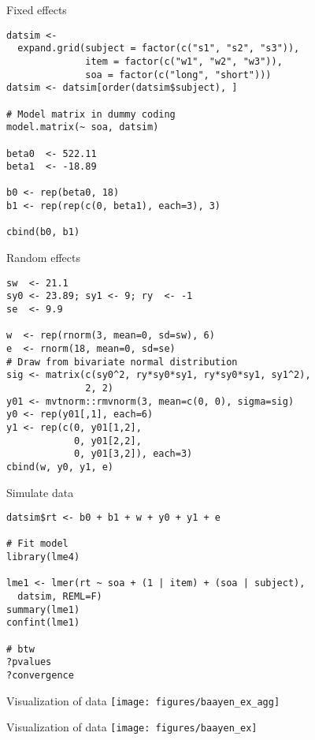 \documentclass{beamer}
\begin{document}
{

\begin{frame}[fragile]{Fixed effects}
  \begin{lstlisting}
datsim <- 
  expand.grid(subject = factor(c("s1", "s2", "s3")),
              item = factor(c("w1", "w2", "w3")),
              soa = factor(c("long", "short")))
datsim <- datsim[order(datsim$subject), ]

# Model matrix in dummy coding
model.matrix(~ soa, datsim)

beta0  <- 522.11
beta1  <- -18.89

b0 <- rep(beta0, 18)
b1 <- rep(rep(c(0, beta1), each=3), 3)

cbind(b0, b1)
  \end{lstlisting}
\end{frame}

\begin{frame}[fragile]{Random effects}
  \begin{lstlisting}
sw  <- 21.1
sy0 <- 23.89; sy1 <- 9; ry  <- -1
se  <- 9.9

w  <- rep(rnorm(3, mean=0, sd=sw), 6)
e  <- rnorm(18, mean=0, sd=se)
# Draw from bivariate normal distribution
sig <- matrix(c(sy0^2, ry*sy0*sy1, ry*sy0*sy1, sy1^2),
              2, 2)
y01 <- mvtnorm::rmvnorm(3, mean=c(0, 0), sigma=sig)
y0 <- rep(y01[,1], each=6)
y1 <- rep(c(0, y01[1,2],
            0, y01[2,2],
            0, y01[3,2]), each=3)
cbind(w, y0, y1, e)
  \end{lstlisting}
\end{frame}

\begin{frame}[fragile]{Simulate data}
  \begin{lstlisting}
datsim$rt <- b0 + b1 + w + y0 + y1 + e

# Fit model
library(lme4)

lme1 <- lmer(rt ~ soa + (1 | item) + (soa | subject),
  datsim, REML=F)
summary(lme1)
confint(lme1)

# btw
?pvalues
?convergence
  \end{lstlisting}
\end{frame}

}

\begin{frame}{Visualization of data}
  \centering
\texttt{[image: figures/baayen\_ex\_agg]}
\end{frame}

\begin{frame}{Visualization of data}
\texttt{[image: figures/baayen\_ex]}
\end{frame}
\end{document}
